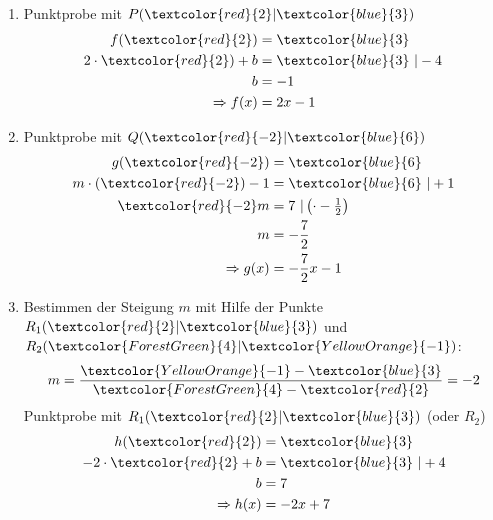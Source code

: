 \begin{Answer}[ref=punktprobeA2]

	\begin{minipage}[t]{0.5\textwidth}
		\begin{enumerate}[label=\alph*)]
			\item Punktprobe mit \(P(\textcolor{red}{2}\vert\textcolor{blue}{3})\)
			\begin{align*}
				f(\textcolor{red}{2})&=\textcolor{blue}{3}\\
				2\cdot\textcolor{red}{2})+b&=\textcolor{blue}{3}\ \vert-4\\
				b&=-1\\
				\Rightarrow f(x)&=2x-1
			\end{align*}
			\item Punktprobe mit \(Q(\textcolor{red}{-2}\vert\textcolor{blue}{6})\)
			\begin{align*}
				g(\textcolor{red}{-2})&=\textcolor{blue}{6}\\
				m\cdot\left(\textcolor{red}{-2}\right)-1&=\textcolor{blue}{6}\ \vert+1\\
				\textcolor{red}{-2}m&=7\ \vert\left(\cdot -\tfrac{1}{2}\right)\\
				m&=-\dfrac{7}{2}\\
				\Rightarrow g(x)&=-\dfrac{7}{2}x-1
			\end{align*}
		\end{enumerate}
	\end{minipage}%
	\begin{minipage}[t]{0.5\textwidth}
		\begin{enumerate}[label=\alph*)]
			\setcounter{enumi}{2}
			\item Bestimmen der Steigung \(m\) mit Hilfe der Punkte \(R_1(\textcolor{red}{2}\vert\textcolor{blue}{3})\) und \(R_2(\textcolor{ForestGreen}{4}\vert\textcolor{YellowOrange}{-1})\):
			\begin{align*}
				m=\dfrac{\textcolor{YellowOrange}{-1}-\textcolor{blue}{3}}{\textcolor{ForestGreen}{4}-\textcolor{red}{2}}=-2
			\end{align*}
			Punktprobe mit \(R_1(\textcolor{red}{2}\vert\textcolor{blue}{3})\) (oder \(R_2\))
			\begin{align*}
				h(\textcolor{red}{2})&=\textcolor{blue}{3}\\
				-2\cdot\textcolor{red}{2}+b&=\textcolor{blue}{3}\ \vert +4\\
				b&=7\\
				\Rightarrow h(x)&=-2x+7
			\end{align*}

\end{enumerate}
\end{minipage}
\end{Answer}
